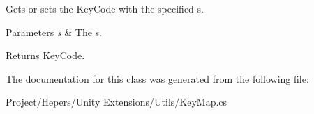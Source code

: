 Gets or sets the Key\+Code with the specified s. 


\begin{DoxyParams}{Parameters}
{\em s} & The s.\\
\hline
\end{DoxyParams}
\begin{DoxyReturn}{Returns}
Key\+Code.
\end{DoxyReturn}


The documentation for this class was generated from the following file\+:\begin{DoxyCompactItemize}
\item 
Project/\+Hepers/\+Unity Extensions/\+Utils/Key\+Map.\+cs\end{DoxyCompactItemize}
